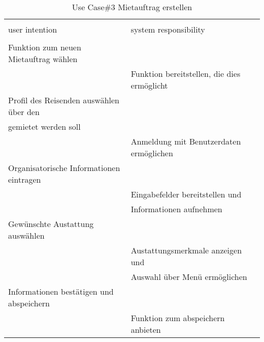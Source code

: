 \begin{table}[H]
\caption{Use Case\#3 Mietauftrag erstellen }
\centering
\begin{tabular}{l l}
\\ [-0.5ex]

\hline\hline
\\ [-0.5ex]
user intention & system responsibility
\\ [1.5ex]
\hline
\\ [-0.5ex]
Funktion zum neuen Mietauftrag wählen 		& 												\\[1ex]
											& Funktion bereitstellen, die dies ermöglicht	\\[1ex]
Profil des Reisenden auswählen über den		& 												\\[1ex]
gemietet werden soll          				& 												\\[1ex]
											& Anmeldung mit Benutzerdaten ermöglichen		\\[1ex]
Organisatorische Informationen eintragen	& 											 	\\[1ex] 
											& Eingabefelder bereitstellen und 				\\[1ex]
											& Informationen aufnehmen 						\\[1ex]
Gewünschte Austattung auswählen				& 					 							\\[1ex]
											& Austattungsmerkmale anzeigen und 				\\[1ex]
											& Auswahl über Menü ermöglichen 				\\[1ex]
Informationen bestätigen und abspeichern 	& 												\\[1ex]
										 	& Funktion zum abspeichern anbieten 			\\[1ex]

\hline
\end{tabular}
\label{tab:mietauftragUC}
\end{table}

